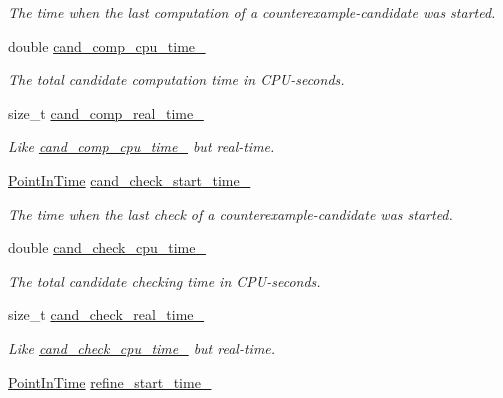 \begin{DoxyCompactItemize}
\begin{DoxyCompactList}\small\item\em The time when the last computation of a counterexample-\/candidate was started. \end{DoxyCompactList}\item 
double \hyperlink{classLearnStatisticsSAT_af977c00fbf0f9978f92dd5c997577a06}{cand\-\_\-comp\-\_\-cpu\-\_\-time\-\_\-}
\begin{DoxyCompactList}\small\item\em The total candidate computation time in C\-P\-U-\/seconds. \end{DoxyCompactList}\item 
size\-\_\-t \hyperlink{classLearnStatisticsSAT_a278872231b15ff010ae4e3a60e8d8f11}{cand\-\_\-comp\-\_\-real\-\_\-time\-\_\-}
\begin{DoxyCompactList}\small\item\em Like \hyperlink{classLearnStatisticsSAT_af977c00fbf0f9978f92dd5c997577a06}{cand\-\_\-comp\-\_\-cpu\-\_\-time\-\_\-} but real-\/time. \end{DoxyCompactList}\item 
\hyperlink{Options_8h_af3a9f634f27bed7e98dbc23e5c6f807d}{Point\-In\-Time} \hyperlink{classLearnStatisticsSAT_a1effa4c15e4349fb1e6f62ad6c79d6c5}{cand\-\_\-check\-\_\-start\-\_\-time\-\_\-}
\begin{DoxyCompactList}\small\item\em The time when the last check of a counterexample-\/candidate was started. \end{DoxyCompactList}\item 
double \hyperlink{classLearnStatisticsSAT_a2ab5cd522b7a4d700a11c0bb430baa81}{cand\-\_\-check\-\_\-cpu\-\_\-time\-\_\-}
\begin{DoxyCompactList}\small\item\em The total candidate checking time in C\-P\-U-\/seconds. \end{DoxyCompactList}\item 
size\-\_\-t \hyperlink{classLearnStatisticsSAT_a2e0611b0c6f80cbc7b36f25ce5e89db9}{cand\-\_\-check\-\_\-real\-\_\-time\-\_\-}
\begin{DoxyCompactList}\small\item\em Like \hyperlink{classLearnStatisticsSAT_a2ab5cd522b7a4d700a11c0bb430baa81}{cand\-\_\-check\-\_\-cpu\-\_\-time\-\_\-} but real-\/time. \end{DoxyCompactList}\item 
\hyperlink{Options_8h_af3a9f634f27bed7e98dbc23e5c6f807d}{Point\-In\-Time} \hyperlink{classLearnStatisticsSAT_af358ee7d57095acbb602d9b9e1329dd2}{refine\-\_\-start\-\_\-time\-\_\-}

\end{DoxyCompactItemize}
